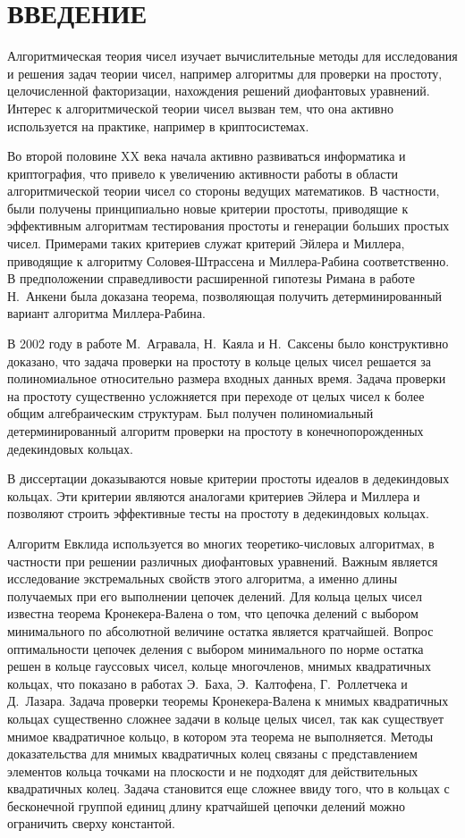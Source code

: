 \documentclass[_00_autoref.tex]{subfiles}
\begin{document}
\chapter*{\MakeUppercase{Введение}\vspace{-2ex}}

Алгоритмическая теория чисел изучает вычислительные методы для исследования и решения задач теории чисел, например алгоритмы для проверки на простоту, целочисленной факторизации, нахождения решений диофантовых уравнений.
Интерес к алгоритмической теории чисел вызван тем, что она активно используется на практике, например в криптосистемах.

Во второй половине XX века начала активно развиваться информатика и криптография, что привело к увеличению активности работы в области алгоритмической теории чисел со стороны ведущих математиков.
В частности, были получены принципиально новые критерии простоты, приводящие к эффективным алгоритмам тестирования простоты и генерации больших простых чисел.
Примерами таких критериев служат критерий Эйлера и Миллера, приводящие к алгоритму Соловея-Штрассена и Миллера-Рабина соответственно.
В предположении справедливости расширенной гипотезы Римана в работе Н.~Анкени была доказана теорема, позволяющая получить детерминированный вариант алгоритма Миллера-Рабина.

В 2002 году в работе М.~Агравала, Н.~Каяла и Н.~Саксены было конструктивно доказано, что задача проверки на простоту в кольце целых чисел решается за полиномиальное относительно размера входных данных время.
Задача проверки на простоту существенно усложняется при переходе от целых чисел к более общим алгебраическим структурам.
Был получен полиномиальный детерминированный алгоритм проверки на простоту в конечнопорожденных дедекиндовых кольцах.

В диссертации доказываются новые критерии простоты идеалов в дедекиндовых кольцах.
Эти критерии являются аналогами критериев Эйлера и Миллера и позволяют строить эффективные тесты на простоту в дедекиндовых кольцах.

Алгоритм Евклида используется во многих теоретико-числовых алгоритмах, в частности при решении различных диофантовых уравнений.
Важным является исследование экстремальных свойств этого алгоритма, а именно длины получаемых при его выполнении цепочек делений.
Для кольца целых чисел известна теорема Кронекера-Валена о том, что цепочка делений с выбором минимального по абсолютной величине остатка является кратчайшей.
Вопрос оптимальности цепочек деления с выбором минимального по норме остатка решен в кольце гауссовых чисел, кольце многочленов, мнимых квадратичных кольцах, что показано в работах Э.~Баха, Э.~Калтофена, Г.~Роллетчека и Д.~Лазара.
Задача проверки теоремы Кронекера-Валена к мнимых квадратичных кольцах существенно сложнее задачи в кольце целых чисел, так как существует мнимое квадратичное кольцо, в котором эта теорема не выполняется.
Методы доказательства для мнимых квадратичных колец связаны с представлением элементов кольца точками на плоскости и не подходят для действительных квадратичных колец.
Задача становится еще сложнее ввиду того, что в кольцах с бесконечной группой единиц длину кратчайшей цепочки делений можно ограничить сверху константой.
\end{document}
